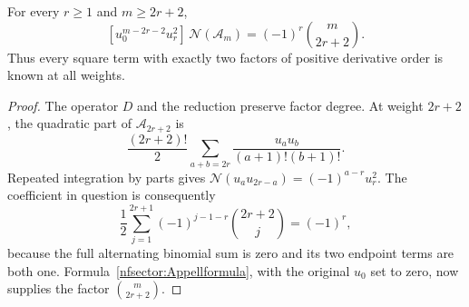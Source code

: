 \begin{theorem}\label{nfsector:squares}
For every $r\ge1$ and $m\ge2r+2$,
\begin{equation}\label{nfsector:squarecoef}
 [u_0^{m-2r-2}u_r^2]\,\mathcal N(\mathcal A_m)
       =(-1)^r\binom{m}{2r+2}.
\end{equation}
Thus every square term with exactly two factors of positive derivative
order is known at all weights.
\end{theorem}
\begin{proof}
The operator $D$ and the reduction preserve factor degree.  At weight
$2r+2$, the quadratic part of $\mathcal A_{2r+2}$ is
\[
 \frac{(2r+2)!}{2}
 \sum_{a+b=2r}\frac{u_a u_b}{(a+1)!(b+1)!}.
\]
Repeated integration by parts gives
$\mathcal N(u_a u_{2r-a})=(-1)^{a-r}u_r^2$.
The coefficient in question is consequently
\[
 \frac12\sum_{j=1}^{2r+1}
       (-1)^{j-1-r}\binom{2r+2}{j}=(-1)^r,
\]
because the full alternating binomial sum is zero and its two
endpoint terms are both one.  Formula~\eqref{nfsector:Appellformula},
with the original $u_0$ set to zero, now supplies the factor
$\binom{m}{2r+2}$.
\end{proof}

